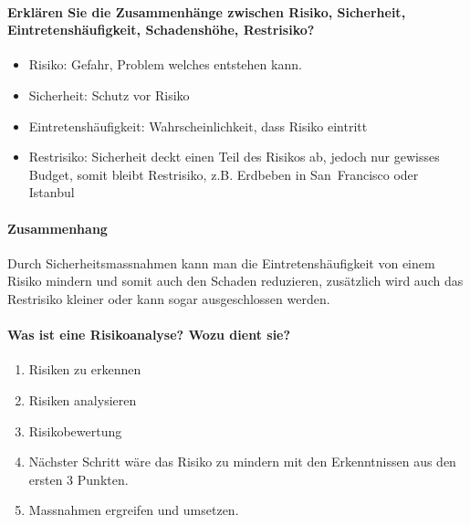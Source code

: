 \documentclass[10pt,a4paper]{article}
\begin{document}
\paragraph*{Erklären Sie die Zusammenhänge zwischen Risiko, Sicherheit, Eintretenshäufigkeit, Schadenshöhe, Restrisiko?}
\begin{itemize}[noitemsep,topsep=0pt,leftmargin=*]
    \item Risiko: Gefahr, Problem welches entstehen kann.
    \item Sicherheit: Schutz vor Risiko
    \item Eintretenshäufigkeit: Wahrscheinlichkeit, dass Risiko eintritt
    \item Restrisiko: Sicherheit deckt einen Teil des Risikos ab, jedoch nur gewisses Budget, somit bleibt Restrisiko, z.B. Erdbeben in San~Francisco oder Istanbul
\end{itemize}

\paragraph*{Zusammenhang}Durch Sicherheitsmassnahmen kann man die Eintretenshäufigkeit von einem Risiko mindern und somit auch den Schaden reduzieren, zusätzlich wird auch das Restrisiko kleiner oder kann sogar ausgeschlossen werden.

\paragraph*{Was ist eine Risikoanalyse? Wozu dient sie?}
\begin{enumerate}[noitemsep,topsep=0pt,leftmargin=*]
    \item Risiken zu erkennen
    \item Risiken analysieren
    \item Risikobewertung
    \item Nächster Schritt wäre das Risiko zu mindern mit den Erkenntnissen aus den ersten 3 Punkten.
    \item Massnahmen ergreifen und umsetzen.
\end{enumerate}
\end{document}
